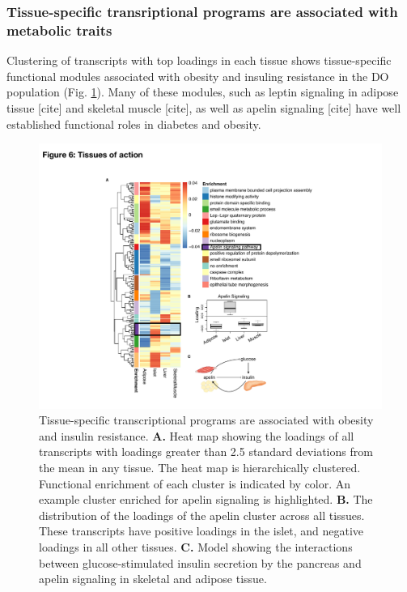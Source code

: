 \documentclass[
]{article}
\begin{document}
\subsubsection{Tissue-specific transriptional programs are associated
with metabolic
traits}\label{tissue-specific-transriptional-programs-are-associated-with-metabolic-traits}

Clustering of transcripts with top loadings in each tissue shows
tissue-specific functional modules associated with obesity and insuling
resistance in the DO population (Fig. \ref{fig:toa}). Many of these
modules, such as leptin signaling in adipose tissue {[}cite{]} and
skeletal muscle {[}cite{]}, as well as apelin signaling {[}cite{]} have
well established functional roles in diabetes and obesity.

\begin{figure}[ht!]
\includegraphics[width=5in]{Figures/Fig6_TOA.pdf} 
\caption{Tissue-specific transcriptional programs are associated 
with obesity and insulin resistance. \textbf{A.} Heat map showing 
the loadings of all transcripts with loadings greater than 2.5 standard 
deviations from the mean in any tissue. The heat map is hierarchically 
clustered. Functional enrichment of each cluster is indicated by color. 
An example cluster enriched for apelin signaling is highlighted. \textbf{B.} 
The distribution of the loadings of the apelin cluster across all tissues. 
These transcripts have positive loadings in the islet, and negative 
loadings in all other tissues. \textbf{C.} Model showing the interactions 
between glucose-stimulated insulin secretion by the pancreas and apelin 
signaling in skeletal and adipose tissue.
}
\label{fig:toa}
\end{figure}
\end{document}
